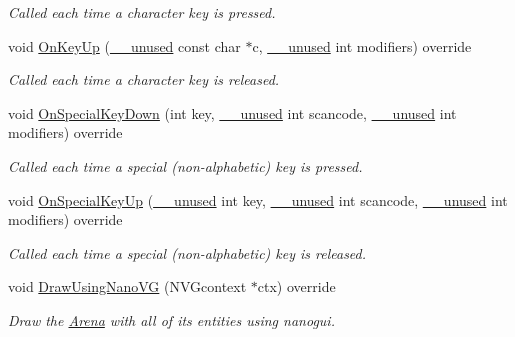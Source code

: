 \begin{DoxyCompactItemize}
\begin{DoxyCompactList}\small\item\em Called each time a character key is pressed. \end{DoxyCompactList}\item 
void \mbox{\hyperlink{class_graphics_arena_viewer_ac3e749f6a75bdd5b32d23c9c8913f9d8}{On\+Key\+Up}} (\mbox{\hyperlink{common_8h_a2e3484535ee610c8e19e9859563abe48}{\+\_\+\+\_\+unused}} const char $\ast$c, \mbox{\hyperlink{common_8h_a2e3484535ee610c8e19e9859563abe48}{\+\_\+\+\_\+unused}} int modifiers) override
\begin{DoxyCompactList}\small\item\em Called each time a character key is released. \end{DoxyCompactList}\item 
void \mbox{\hyperlink{class_graphics_arena_viewer_ab6ed6287ddf72f43f605482ce77b01a2}{On\+Special\+Key\+Down}} (int key, \mbox{\hyperlink{common_8h_a2e3484535ee610c8e19e9859563abe48}{\+\_\+\+\_\+unused}} int scancode, \mbox{\hyperlink{common_8h_a2e3484535ee610c8e19e9859563abe48}{\+\_\+\+\_\+unused}} int modifiers) override
\begin{DoxyCompactList}\small\item\em Called each time a special (non-\/alphabetic) key is pressed. \end{DoxyCompactList}\item 
void \mbox{\hyperlink{class_graphics_arena_viewer_a086e2e29e1a5745a8ee4f12996897b22}{On\+Special\+Key\+Up}} (\mbox{\hyperlink{common_8h_a2e3484535ee610c8e19e9859563abe48}{\+\_\+\+\_\+unused}} int key, \mbox{\hyperlink{common_8h_a2e3484535ee610c8e19e9859563abe48}{\+\_\+\+\_\+unused}} int scancode, \mbox{\hyperlink{common_8h_a2e3484535ee610c8e19e9859563abe48}{\+\_\+\+\_\+unused}} int modifiers) override
\begin{DoxyCompactList}\small\item\em Called each time a special (non-\/alphabetic) key is released. \end{DoxyCompactList}\item 
void \mbox{\hyperlink{class_graphics_arena_viewer_a7d59755e3f7674f382127fe135492eeb}{Draw\+Using\+Nano\+VG}} (N\+V\+Gcontext $\ast$ctx) override
\begin{DoxyCompactList}\small\item\em Draw the \mbox{\hyperlink{class_arena}{Arena}} with all of its entities using {\ttfamily nanogui}. \end{DoxyCompactList}\item 

\end{DoxyCompactItemize}
